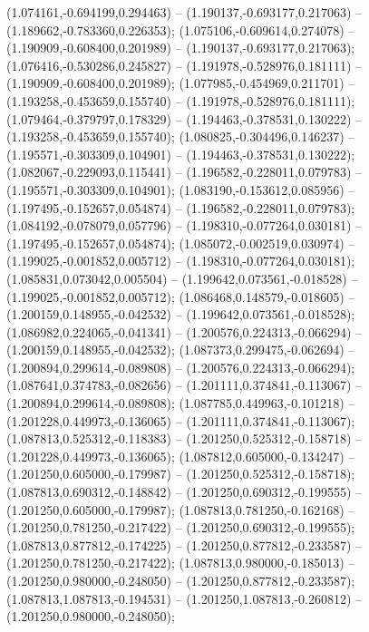  (1.074161,-0.694199,0.294463) -- (1.190137,-0.693177,0.217063) -- (1.189662,-0.783360,0.226353);
 (1.075106,-0.609614,0.274078) -- (1.190909,-0.608400,0.201989) -- (1.190137,-0.693177,0.217063);
 (1.076416,-0.530286,0.245827) -- (1.191978,-0.528976,0.181111) -- (1.190909,-0.608400,0.201989);
 (1.077985,-0.454969,0.211701) -- (1.193258,-0.453659,0.155740) -- (1.191978,-0.528976,0.181111);
 (1.079464,-0.379797,0.178329) -- (1.194463,-0.378531,0.130222) -- (1.193258,-0.453659,0.155740);
 (1.080825,-0.304496,0.146237) -- (1.195571,-0.303309,0.104901) -- (1.194463,-0.378531,0.130222);
 (1.082067,-0.229093,0.115441) -- (1.196582,-0.228011,0.079783) -- (1.195571,-0.303309,0.104901);
 (1.083190,-0.153612,0.085956) -- (1.197495,-0.152657,0.054874) -- (1.196582,-0.228011,0.079783);
 (1.084192,-0.078079,0.057796) -- (1.198310,-0.077264,0.030181) -- (1.197495,-0.152657,0.054874);
 (1.085072,-0.002519,0.030974) -- (1.199025,-0.001852,0.005712) -- (1.198310,-0.077264,0.030181);
 (1.085831,0.073042,0.005504) -- (1.199642,0.073561,-0.018528) -- (1.199025,-0.001852,0.005712);
 (1.086468,0.148579,-0.018605) -- (1.200159,0.148955,-0.042532) -- (1.199642,0.073561,-0.018528);
 (1.086982,0.224065,-0.041341) -- (1.200576,0.224313,-0.066294) -- (1.200159,0.148955,-0.042532);
 (1.087373,0.299475,-0.062694) -- (1.200894,0.299614,-0.089808) -- (1.200576,0.224313,-0.066294);
 (1.087641,0.374783,-0.082656) -- (1.201111,0.374841,-0.113067) -- (1.200894,0.299614,-0.089808);
 (1.087785,0.449963,-0.101218) -- (1.201228,0.449973,-0.136065) -- (1.201111,0.374841,-0.113067);
 (1.087813,0.525312,-0.118383) -- (1.201250,0.525312,-0.158718) -- (1.201228,0.449973,-0.136065);
 (1.087812,0.605000,-0.134247) -- (1.201250,0.605000,-0.179987) -- (1.201250,0.525312,-0.158718);
 (1.087813,0.690312,-0.148842) -- (1.201250,0.690312,-0.199555) -- (1.201250,0.605000,-0.179987);
 (1.087813,0.781250,-0.162168) -- (1.201250,0.781250,-0.217422) -- (1.201250,0.690312,-0.199555);
 (1.087813,0.877812,-0.174225) -- (1.201250,0.877812,-0.233587) -- (1.201250,0.781250,-0.217422);
 (1.087813,0.980000,-0.185013) -- (1.201250,0.980000,-0.248050) -- (1.201250,0.877812,-0.233587);
 (1.087813,1.087813,-0.194531) -- (1.201250,1.087813,-0.260812) -- (1.201250,0.980000,-0.248050);
